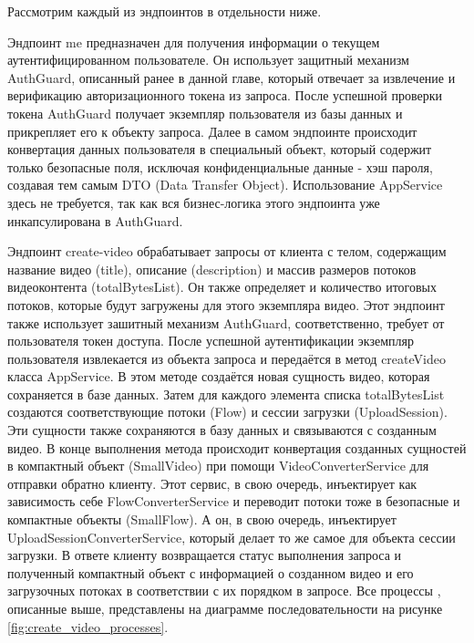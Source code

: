 	Рассмотрим каждый из эндпоинтов в отдельности ниже.

	Эндпоинт me предназначен для получения информации о текущем аутентифицированном пользователе. Он использует защитный механизм AuthGuard, описанный ранее в данной главе, который отвечает за извлечение и верификацию авторизационного токена из запроса. После успешной проверки токена AuthGuard получает экземпляр пользователя из базы данных и прикрепляет его к объекту запроса. Далее в самом эндпоинте происходит конвертация данных пользователя в специальный объект, который содержит только безопасные поля, исключая конфиденциальные данные - хэш пароля, создавая тем самым DTO (Data Transfer Object). Использование AppService здесь не требуется, так как вся бизнес-логика этого эндпоинта уже инкапсулирована в AuthGuard.

	Эндпоинт create-video обрабатывает запросы от клиента с телом, содержащим название видео (title), описание (description) и массив размеров потоков видеоконтента (totalBytesList). Он также определяет и количество итоговых потоков, которые будут загружены для этого экземпляра видео. Этот эндпоинт также использует зашитный механизм AuthGuard, соответственно, требует от пользователя токен доступа. После успешной аутентификации экземпляр пользователя извлекается из объекта запроса и передаётся в метод createVideo класса AppService. В этом методе создаётся новая сущность видео, которая сохраняется в базе данных. Затем для каждого элемента списка totalBytesList создаются соответствующие потоки (Flow) и сессии загрузки (UploadSession). Эти сущности также сохраняются в базу данных и связываются с созданным видео. В конце выполнения метода происходит конвертация созданных сущностей в компактный объект (SmallVideo) при помощи VideoConverterService для отправки обратно клиенту. Этот сервис, в свою очередь, инъектирует как зависимость себе FlowConverterService и переводит потоки тоже в безопасные и компактные объекты (SmallFlow). А он, в свою очередь, инъектирует UploadSessionConverterService, который делает то же самое для объекта сессии загрузки. В ответе клиенту возвращается статус выполнения запроса и полученный компактный объект с информацией о созданном видео и его загрузочных потоках в соответствии с их порядком в запросе. Все процессы , описанные выше, представлены на диаграмме последовательности на рисунке \ref{fig:create_video_processes}.

